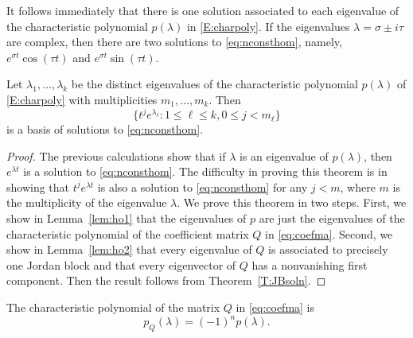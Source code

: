\documentclass{ximera}
\begin{document}
It follows immediately that there is one solution associated to 
each eigenvalue of the characteristic polynomial $p(\lambda)$ in 
\eqref{E:charpoly}.  If the eigenvalues $\lambda=\sigma\pm i\tau$ are complex, 
then there are two solutions to \eqref{eq:nconsthom}, namely,
$e^{\sigma t}\cos(\tau t)$ and $e^{\sigma t}\sin(\tau t)$.
\begin{theorem} \label{T:hoe}
Let $\lambda_1,\ldots,\lambda_k$ be the distinct eigenvalues of the 
characteristic 
polynomial 
$p(\lambda)$ of \eqref{E:charpoly} with multiplicities 
$m_1,\ldots,m_k$.  Then 
\[
\{t^je^{\lambda_\ell}: 1\leq\ell\leq k, 0\leq j<m_\ell\}
\]
is a basis of solutions to \eqref{eq:nconsthom}.
\end{theorem} 

\begin{proof}  The previous calculations show that if $\lambda$ is an eigenvalue 
of $p(\lambda)$, then $e^{\lambda t}$ is a solution to \eqref{eq:nconsthom}.  
The difficulty in proving this theorem is in showing that $t^je^{\lambda t}$ 
is also a solution to \eqref{eq:nconsthom} for any $j<m$, where $m$ is the 
multiplicity of the eigenvalue $\lambda$.  We prove this theorem in two steps.
First, we show in Lemma~\ref{lem:ho1} that the eigenvalues of $p$ are just the 
eigenvalues of the characteristic polynomial of the coefficient matrix $Q$ in 
\eqref{eq:coefma}.  Second, we show in Lemma~\ref{lem:ho2} that every eigenvalue 
of $Q$ is associated to precisely one Jordan block and that
every eigenvector of $Q$ has a nonvanishing first component. 
Then the result follows from Theorem~\ref{T:JBsoln}.  \end{proof}

\begin{lemma}  \label{lem:ho1}
The characteristic polynomial of 
the matrix $Q$ in \eqref{eq:coefma} is 
\[
p_Q(\lambda) = (-1)^np(\lambda).
\]
\end{lemma}
\end{document}

